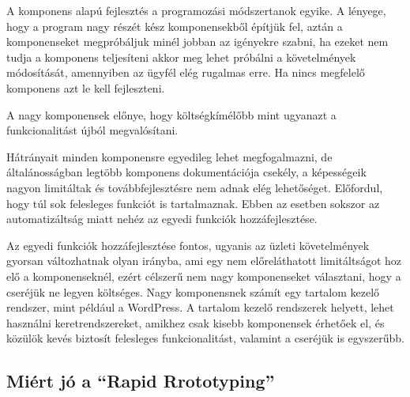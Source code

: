 \documentclass[a4paper,12pt,oneside]{report}
\begin{document}
\begin{justify}
	A komponens alapú fejlesztés a programozási módszertanok egyike. A lényege, hogy a program nagy részét kész komponensekből építjük fel, aztán a komponenseket megpróbáljuk minél jobban az igényekre szabni, ha ezeket nem tudja a komponens teljesíteni akkor meg lehet próbálni a követelmények módosítását, amennyiben az ügyfél elég rugalmas erre. Ha nincs megfelelő komponens azt le kell fejleszteni. \cite{website:component_based_development}

	A nagy komponensek előnye, hogy költségkímélőbb mint ugyanazt a funkcionalitást újból megvalósítani.

	Hátrányait minden komponensre egyedileg lehet megfogalmazni, de általánosságban legtöbb komponens dokumentációja csekély, a képességeik nagyon limitáltak és továbbfejlesztésre nem adnak elég lehetőséget. Előfordul, hogy túl sok felesleges funkciót is tartalmaznak. Ebben az esetben sokszor az automatizáltság miatt nehéz az egyedi funkciók hozzáfejlesztése.

	Az egyedi funkciók hozzáfejlesztése fontos, ugyanis az üzleti követelmények gyorsan változhatnak olyan irányba, ami egy nem előreláthatott limitáltságot hoz elő a komponenseknél, ezért célszerű nem nagy komponenseket választani, hogy a cseréjük ne legyen költséges. Nagy komponensnek számít egy tartalom kezelő rendszer, mint például a WordPress. A tartalom kezelő rendszerek helyett, lehet használni keretrendszereket, amikhez csak kisebb komponensek érhetőek el, és közülök kevés biztosít felesleges funkcionalitást, valamint a cseréjük is egyszerűbb. \cite{website:cms_or_fw}

\end{justify}

\newpage
\subsection{Miért jó a “Rapid Rrototyping”}
\end{document}
